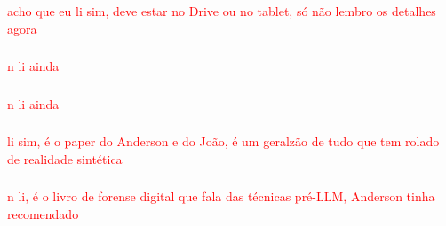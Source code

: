 \documentclass[
  letterpaper,
  DIV=11,
  numbers=noendperiod]{scrartcl}
\begin{document}
\subsubsection{\texorpdfstring{\autocite{Kiela2021_TheHatefulMemesChallengeDetectingHateSpeechInMultimodalMemes}}{{[}@Kiela2021\_TheHatefulMemesChallengeDetectingHateSpeechInMultimodalMemes{]}}}\label{kiela2021_thehatefulmemeschallengedetectinghatespeechinmultimodalmemes}

\textcolor{red}{acho que eu li sim, deve estar no Drive ou no tablet, só não lembro os detalhes agora}

\subsubsection{\texorpdfstring{\autocite{Fersini2022_SemEval2022Task5MultimediaAutomaticMisogynyIdentification}}{{[}@Fersini2022\_SemEval2022Task5MultimediaAutomaticMisogynyIdentification{]}}}\label{fersini2022_semeval2022task5multimediaautomaticmisogynyidentification}

\textcolor{red}{n li ainda}

\subsubsection{\texorpdfstring{\autocite{Hwang2023_MemeCapCaptioningAndInterpretingMemes}}{{[}@Hwang2023\_MemeCapCaptioningAndInterpretingMemes{]}}}\label{hwang2023_memecapcaptioningandinterpretingmemes}

\textcolor{red}{n li ainda}

\subsubsection{\texorpdfstring{\autocite{Cardenuto2023_TheAgeOfSyntheticRealitiesChallengesAndOpportunities}}{{[}@Cardenuto2023\_TheAgeOfSyntheticRealitiesChallengesAndOpportunities{]}}}\label{cardenuto2023_theageofsyntheticrealitieschallengesandopportunities}

\textcolor{red}{li sim, é o paper do Anderson e do João, é um geralzão de tudo que tem rolado de realidade sintética}

\subsubsection{\texorpdfstring{\autocite{Farid2016_PhotoForensics}}{{[}@Farid2016\_PhotoForensics{]}}}\label{farid2016_photoforensics}

\textcolor{red}{n li, é o livro de forense digital que fala das técnicas pré-LLM, Anderson tinha recomendado}
\end{document}
